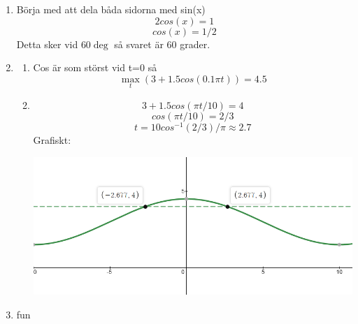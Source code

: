 \documentclass[a4paper,12pt]{article}
\begin{document}
\begin{enumerate}
    \item Börja med att dela båda sidorna med sin(x)
          $$2cos(x)=1$$
          $$cos(x)=1/2$$
          Detta sker vid $60\deg$ så svaret är 60 grader.

    \item \begin{enumerate}
              \item Cos är som störst vid t=0 så
                    $$\max_{t}(3+1.5cos(0.1\pi t))=4.5$$
              \item
                    $$3+1.5cos(\pi t/10)=4$$
                    $$cos(\pi t/10)=2/3$$
                    $$t=10cos^{-1}(2/3)/\pi \approx 2.7$$
                    Grafiskt:

                    \includegraphics[scale=0.5]{Figur4.png}

          \end{enumerate}

    \item fun
\end{enumerate}
\end{document}
